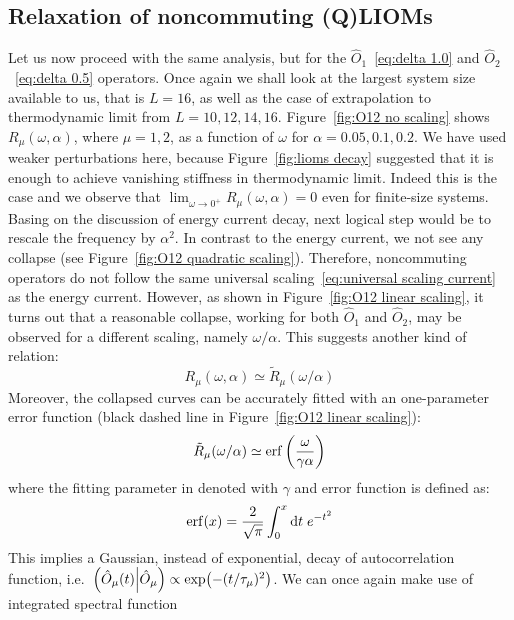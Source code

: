 \subsection{Relaxation of noncommuting (Q)LIOMs}
Let us now proceed with the same analysis, but for the \(\hat{O}_1\)~\eqref{eq:delta 1.0} 
and \(\hat{O}_2\)~\eqref{eq:delta 0.5} operators. Once again we shall look at the largest
system size available to us, that is \(L = 16\), as well as the case of extrapolation
to thermodynamic limit from \(L = 10,12,14,16\). 
Figure~\ref{fig:O12 no scaling} shows
\(R_{\mu}(\omega,\alpha)\), where \(\mu=1,2\), as a function of \(\omega\) for \(\alpha = 0.05,0.1,0.2\).
We have used weaker perturbations here, because Figure~\ref{fig:lioms decay} suggested that
it is enough to achieve vanishing stiffness in thermodynamic limit. Indeed this is the case
and we observe that \(\lim_{{\omega\to 0^{+}}} R_{\mu}(\omega,\alpha) = 0\) even for finite-size systems.
Basing on the discussion of energy current decay, next logical step would be to rescale the
frequency by \(\alpha^2\).
In contrast to the energy current, we not see any collapse (see Figure~\ref{fig:O12 quadratic scaling}).
Therefore, noncommuting operators do not follow the same universal scaling~\eqref{eq:universal scaling current}
as the energy current. However, as shown in Figure~\ref{fig:O12 linear scaling},
it turns out that a reasonable collapse, working for both \(\hat{O}_1\) and \(\hat{O}_2\),
may be observed for a different scaling, namely \(\omega/\alpha\). This suggests another kind
of relation:
\begin{equation}
  R_{\mu}(\omega,\alpha) \simeq \tilde{R}_{\mu}(\omega/\alpha)
\end{equation}
Moreover, the collapsed curves can be accurately fitted with an one-parameter error function
 (black dashed line in Figure~\ref{fig:O12 linear scaling}):
\begin{equation}
  \tilde{R}_{\mu}(\omega/\alpha) \simeq \erf\left(\frac{\omega}{\gamma \alpha}\right)
  \label{eq:erf fit}
\end{equation}
where the fitting parameter in denoted with \(\gamma\) and error function is defined as:
\begin{equation}
\erf(x) = \frac{2}{\sqrt{\pi}} \int_{0}^{x} \mathrm{d}t\; e^{-t^2}  
\end{equation}
This implies a Gaussian, instead of
exponential, decay of autocorrelation function, i.e.\ \(\left(\hat{O}_{\mu}(t) \middle| \hat{O}_{\mu}\right)
\propto \exp(-(t/\tau_{\mu})^2)\). We can once again make use of integrated spectral function
